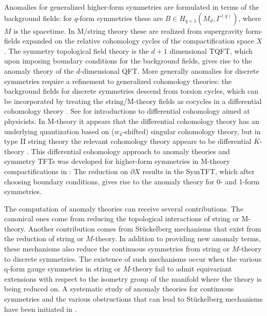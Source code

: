 \documentclass[12pt]{article}
\begin{document}
Anomalies for generalized higher-form symmetries are formulated in terms of the background fields: for $q$-form symmetries these are $B\in H_{q+1} (M_d, \Gamma^{(q)})$, where $M$ is the spacetime. In M/string theory these are realized from supergravity form-fields expanded on the relative cohomology cycles of the compactification space $X$. The symmetry topological field theory is the $d+1$ dimensional TQFT, which upon imposing boundary conditions for the background fields, gives rise to the anomaly theory of the $d$-dimensional QFT. 
More generally anomalies for discrete symmetries require a refinement to generalized cohomology theories: the background fields for discrete symmetries descend from torsion cycles, which can be incorporated by treating the string/M-theory fields as cocycles in a differential cohomology theory
 \cite{CheegerSimons, Hopkins:2002rd}. See 
 \cite{Freed:2000ta,Freed:2006yc} for introductions to differential cohomology aimed at physicists. 
In M-theory it appears that the differential cohomology theory has an 
underlying quantization based on ($w_4$-shifted) singular cohomology theory, 
but in type II string theory the relevant cohomology theory appears to be 
differential $K$-theory 
\cite{Belov:2006xj,Freed:2000ta,Freed:2006ya,Freed:2006yc,Moore:1999gb}.
 This differential cohomology approach to anomaly theories and symmetry TFTs was developed for higher-form symmetries in 
M-theory compactifications in \cite{Apruzzi:2021nmk}:
The reduction on $\partial X$ results in the SymTFT, which after choosing boundary conditions, gives rise to the anomaly theory for 0- and 1-form symmetries. 


The computation of anomaly theories can receive several contributions.  The canonical ones come from reducing the topological interactions of string or M-theory.  Another contribution comes from St{\"u}ckelberg mechanisms that exist from the reduction of string or $M$-theory.  In addition to providing new anomaly terms, these mechanisms also reduce the continuous symmetries from string or $M$-theory to discrete symmetries.  The existence of such mechanisms occur when the various q-form gauge symmetries in string or $M$-theory fail to admit equivariant extensions with respect to the isometry group of the manifold where the theory is being reduced on.  A systematic study of anomaly theories for continuous symmetries and the various obstructions that can lead to St{\"u}ckelberg mechanisms have been initiated in \cite{Bah:2018jrv,Bah:2019jts,Bah:2019rgq,Bah:2019vmq,Bah:2020jas,Bah:2020uev,Bergman:2020ifi}. 
\end{document}
